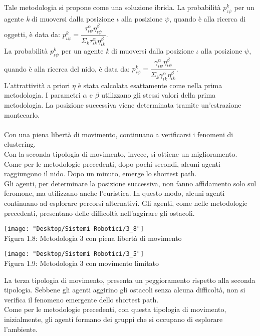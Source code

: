 \documentclass[12pt,a4paper,openright,twoside]{report}
\begin{document}
Tale metodologia si propone come una soluzione ibrida. La probabilità $p^k_{\iota\psi}$ per un agente \textit{k} di muoversi dalla posizione $\iota$ alla posizione $\psi$, quando è alla ricerca di oggetti, è data da: $p^k_{\iota\psi}= \dfrac{\tau^\alpha_{\iota\psi}\eta^\beta_{\iota\psi}}{\Sigma_k\tau^\alpha_{\iota k}\eta^\beta_{\iota k}}$. \\
La probabilità $p^k_{\iota\psi}$ per un agente \textit{k} di muoversi dalla posizione $\iota$ alla posizione $\psi$, quando è alla ricerca del nido, è data da: $p^k_{\iota\psi}= \dfrac{\gamma^\alpha_{\iota\psi}\eta^\beta_{\iota\psi}}{\Sigma_k\gamma^\alpha_{\iota k}\eta^\beta_{\iota k}}$. \\
L'attrattività a priori $\eta$ è stata calcolata esattamente come nella prima metodologia. I parametri $\alpha$ e $\beta$ utilizzano gli stessi valori della prima metodologia. La posizione successiva viene determinata tramite un'estrazione montecarlo.\\\\
Con una piena libertà di movimento, continuano a verificarsi i fenomeni di clustering.\\
Con la seconda tipologia di movimento, invece, si ottiene un miglioramento. Come per le metodologie precedenti, dopo pochi secondi, alcuni agenti raggiungono il nido. Dopo un minuto, emerge lo shortest path.\\ 
Gli agenti, per determinare la posizione successiva, non fanno affidamento solo sul feromone, ma utilizzano anche l'euristica. In questo modo, alcuni agenti continuano ad esplorare percorsi alternativi. Gli agenti, come nelle metodologie precedenti, presentano delle difficoltà nell'aggirare gli ostacoli.\\

\begin{center}  
	\texttt{[image: "Desktop/Sistemi Robotici/3\_8"]}
	\\Figura 1.8: Metodologia 3 con piena libertà di movimento
\end{center}


\begin{center}  
	\texttt{[image: "Desktop/Sistemi Robotici/3\_5"]}
	\\Figura 1.9: Metodologia 3 con movimento limitato
\end{center}

La terza tipologia di movimento, presenta un peggioramento rispetto alla seconda tipologia. Sebbene gli agenti aggirino gli ostacoli senza alcuna difficoltà, non si verifica il fenomeno emergente dello shortest path.\\Come per le metodologie precedenti, con questa tipologia di movimento, inizialmente, gli agenti formano dei gruppi che si occupano di esplorare l'ambiente.\\
\end{document}
